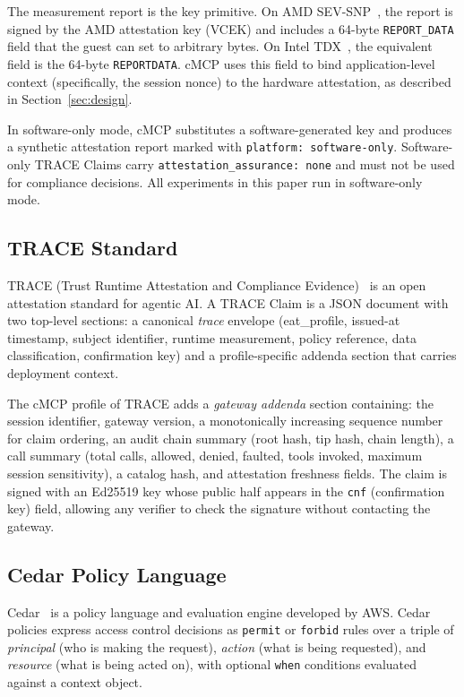 The measurement report is the key primitive. On AMD SEV-SNP~\citep{amdsevsnp2023}, the
report is signed by the AMD attestation key (VCEK) and includes a 64-byte
\texttt{REPORT\_DATA} field that the guest can set to arbitrary bytes. On Intel
TDX~\citep{inteltdx2023}, the equivalent field is the 64-byte \texttt{REPORTDATA}. cMCP uses this field to bind application-level
context (specifically, the session nonce) to the hardware attestation, as described in
Section~\ref{sec:design}.

In software-only mode, cMCP substitutes a software-generated key and produces a synthetic
attestation report marked with \texttt{platform: software-only}. Software-only TRACE Claims
carry \texttt{attestation\_assurance: none} and must not be used for compliance decisions.
All experiments in this paper run in software-only mode.

\subsection{TRACE Standard}

TRACE (Trust Runtime Attestation and Compliance Evidence)~\citep{trace2025} is an open
attestation standard for agentic AI. A TRACE Claim is a JSON document with two top-level
sections: a canonical \emph{trace} envelope (eat\_profile, issued-at timestamp, subject
identifier, runtime measurement, policy reference, data classification, confirmation key)
and a profile-specific addenda section that carries deployment context.

The cMCP profile of TRACE adds a \emph{gateway addenda} section containing: the session
identifier, gateway version, a monotonically increasing sequence number for claim ordering,
an audit chain summary (root hash, tip hash, chain length), a call summary (total calls,
allowed, denied, faulted, tools invoked, maximum session sensitivity), a catalog hash, and
attestation freshness fields. The claim is signed with an Ed25519 key whose public half
appears in the \texttt{cnf} (confirmation key) field, allowing any verifier to check the
signature without contacting the gateway.

\subsection{Cedar Policy Language}

Cedar~\citep{cedar2023} is a policy language and evaluation engine developed by AWS. Cedar
policies express access control decisions as \texttt{permit} or \texttt{forbid} rules over
a triple of \emph{principal} (who is making the request), \emph{action} (what is being
requested), and \emph{resource} (what is being acted on), with optional \texttt{when}
conditions evaluated against a context object.

